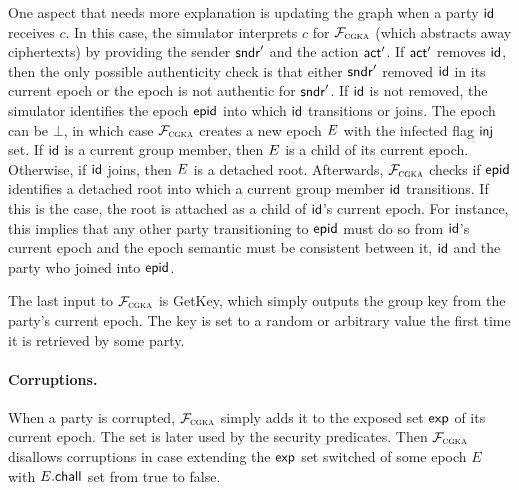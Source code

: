 One aspect that needs more explanation is updating the graph when a party ${\mathsf{id}}$ receives $c$. In this case, the simulator interprets $c$ for $\mathcal{F}_{\normalfont\textsc{cgka}}$ (which abstracts away ciphertexts) by providing the sender $\mathsf{sndr}'$ and the action $\mathsf{act}'$. If $\mathsf{act}'$ removes ${\mathsf{id}}$, then the only possible authenticity check is that either $\mathsf{sndr}'$ removed ${\mathsf{id}}$ in its current epoch or the epoch is not authentic for $\mathsf{sndr}'$.
%
If ${\mathsf{id}}$ is not removed, the simulator identifies the epoch ${\normalfont\textsf{epid}}$ into which ${\mathsf{id}}$ transitions or joins. The epoch can be $\bot$, in which case $\mathcal{F}_{\normalfont\textsc{cgka}}$ creates a new epoch $E$ with the infected flag $\textsf{inj}$ set. If ${\mathsf{id}}$ is a current group member, then $E$ is a child of its current epoch. Otherwise, if ${\mathsf{id}}$ joins, then $E$ is a detached root.
Afterwards, $\mathcal{F}_{\normalfont\textsc{cgka}}$ checks if ${\normalfont\textsf{epid}}$ identifies a detached root into which a current group member ${\mathsf{id}}$ transitions. If this is the case, the root is attached as a child of ${\mathsf{id}}$'s current epoch. For instance, this implies that any other party transitioning to ${\normalfont\textsf{epid}}$ must do so from ${\mathsf{id}}$'s current epoch and the epoch semantic must be consistent between it, ${\mathsf{id}}$ and the party who joined into ${\normalfont\textsf{epid}}$.

The last input to $\mathcal{F}_{\normalfont\textsc{cgka}}$ is GetKey, which simply outputs the group key from the party's current epoch. The key is set to a random or arbitrary value the first time it is retrieved by some party.

\paragraph{Corruptions.}
When a party is corrupted, $\mathcal{F}_{\normalfont\textsc{cgka}}$ simply adds it to the exposed set $\mathsf{exp}$ of its current epoch. The set is later used by the security predicates. Then $\mathcal{F}_{\normalfont\textsc{cgka}}$ disallows corruptions in case extending the $\mathsf{exp}$ set switched \KwConf{} of some epoch $E$ with $E.\mathsf{chall}$ set from true to false.



